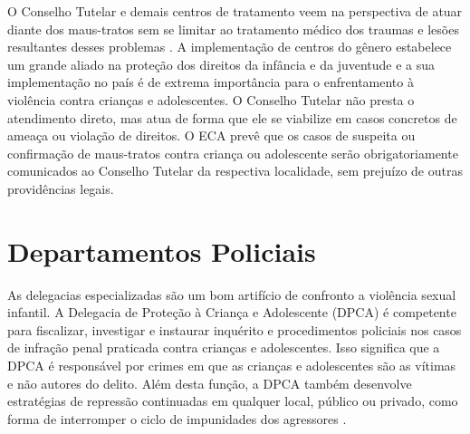 O Conselho Tutelar e demais centros de tratamento veem na perspectiva de atuar diante dos maus-tratos sem se limitar ao tratamento médico dos traumas e lesões resultantes desses problemas \cite{brasil2002notificaccao}. A implementação de centros do gênero estabelece um grande aliado na proteção dos direitos da infância e da juventude e a sua implementação no país é de extrema importância para o enfrentamento à violência contra crianças e adolescentes. %
O Conselho Tutelar não presta o atendimento direto, mas atua de forma que ele se viabilize em casos concretos de ameaça ou violação de direitos. O ECA prevê que os casos de suspeita ou confirmação de maus-tratos contra criança ou adolescente serão obrigatoriamente comunicados ao Conselho Tutelar da respectiva localidade, sem prejuízo de outras providências legais.





\section{Departamentos Policiais}\label{sec:dp}

As delegacias especializadas são um bom artifício de confronto a violência sexual infantil. A Delegacia de Proteção à Criança e Adolescente (DPCA) é competente para fiscalizar, investigar e instaurar inquérito e procedimentos policiais nos casos de infração penal praticada contra crianças e adolescentes. Isso significa que a DPCA é responsável por crimes em que as crianças e adolescentes são as vítimas e não autores do delito. Além desta função, a DPCA também desenvolve estratégias de repressão continuadas em qualquer local, público ou privado, como forma de interromper o ciclo de impunidades dos agressores \cite{rodrigues2014}. %

